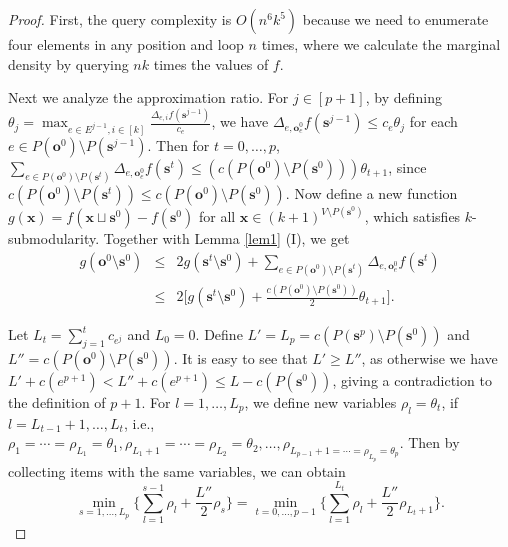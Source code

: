 \documentclass[preprint,12pt]{elsarticle}
\newcommand{\be}{\begin{equation}}
\newcommand{\ee}{\end{equation}}
\def\bea{\begin{eqnarray}}
\def\eea{\end{eqnarray}}
\def\nn{\nonumber}
\def\bo{\boldsymbol{o}}
\def\bs{\boldsymbol{s}}
\def\bx{\boldsymbol{x}}
\begin{document}
\begin{proof}
First, the query complexity is $O(n^{6}k^{5})$ because we need to enumerate four elements in any position and loop $n$ times, where we calculate the marginal density by querying $n k$ times the values of $f$.

Next we analyze the approximation ratio.
For $j\in [p+1]$, by defining $\theta_j=\max_{e\in E^{j-1}, i\in[k]}\frac{\Delta_{e, i}f(\bs^{j-1})}{c_e}$, we have $\Delta_{e, \bo^0_e} f(\bs^{j-1}) \le c_e\theta_{j}$ for each $e\in P(\bo^0)\setminus P(\bs^{j-1})$.
Then for $t=0, \dots, p$, $\sum_{e\in P(\bo^0)\setminus P(\bs^t)} \Delta_{e, \bo^0_e}f(\bs^t) \leq (c(P(\bo^0) \setminus P(\bs^0))) \theta_{t+1}$, since $c(P(\bo^0)\setminus P(\bs^t))\le c(P(\bo^0) \setminus P(\bs^0))$.
Now define a new function $g(\bx)=f(\bx \sqcup \bs^0)-f(\bs^0)$ for all $\bx \in (k+1)^{V\setminus P(\bs^0)}$, which satisfies $k$-submodularity.
Together with Lemma \ref{lem1} (I), we get
\bea\label{(5)}
g(\bo^0 \setminus \bs^0)
&\leq& 2g(\bs^t \setminus \bs^0)+\sum_{e\in P(\bo^0)\setminus P(\bs^t)}\Delta_{e, \bo^0_e}f(\bs^t) \nn\\
&\leq& 2\big[g(\bs^t \setminus \bs^0)+\frac{c(P(\bo^0) \setminus P(\bs^0))}{2}\theta_{t+1}\big].
\eea


Let $L_t=\sum_{j=1}^t c_{e^j}$ and $L_0=0$.
Define $L' =  L_p = c(P(\bs^p) \setminus P(\bs^0))$ and $L'' = c(P(\bo^0) \setminus P(\bs^0))$.
It is easy to see that $L' \ge L''$, as otherwise we have $L' + c(e^{p+1}) < L'' + c(e^{p+1}) \le L - c(P(\bs^0))$, giving a contradiction to the definition of $p+1$.
For $l=1, \dots, L_p$, we define new variables $\rho_l=\theta_{t}$, if $l=L_{t-1}+1, \dots, L_t$, i.e., $\rho_1 = \cdots = \rho_{L_1} = \theta_1, \rho_{L_1+1} = \cdots = \rho_{L_2} = \theta_2, \ldots, \rho_{L_{p-1} + 1= \cdots = \rho_{L_p} = \theta_p}$. Then by collecting items with the same variables, we can obtain
\be\label{min}
\min_{s=1, \dots, L_p } \{ \sum_{l=1}^{s-1} \rho_l + \frac{L''} {2} \rho_s \} = \min_{t=0, \dots, p-1} \{ \sum_{l=1}^{L_t} \rho_l + \frac{L''}{2} \rho_{L_t+1}\}.
\ee


\end{proof}
\end{document}
